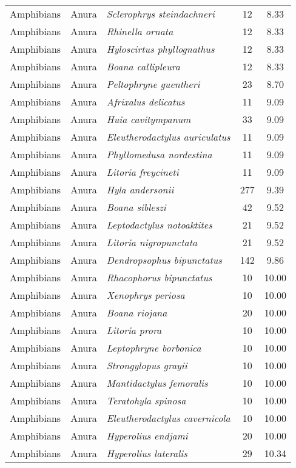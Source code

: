 \begin{longtable}{ll>{\itshape}lcc}
  Amphibians & Anura & Sclerophrys steindachneri &  12 & 8.33 \\ 
  Amphibians & Anura & Rhinella ornata &  12 & 8.33 \\ 
  Amphibians & Anura & Hyloscirtus phyllognathus &  12 & 8.33 \\ 
  Amphibians & Anura & Boana callipleura &  12 & 8.33 \\ 
  Amphibians & Anura & Peltophryne guentheri &  23 & 8.70 \\ 
  Amphibians & Anura & Afrixalus delicatus &  11 & 9.09 \\ 
  Amphibians & Anura & Huia cavitympanum &  33 & 9.09 \\ 
  Amphibians & Anura & Eleutherodactylus auriculatus &  11 & 9.09 \\ 
  Amphibians & Anura & Phyllomedusa nordestina &  11 & 9.09 \\ 
  Amphibians & Anura & Litoria freycineti &  11 & 9.09 \\ 
  Amphibians & Anura & Hyla andersonii & 277 & 9.39 \\ 
  Amphibians & Anura & Boana sibleszi &  42 & 9.52 \\ 
  Amphibians & Anura & Leptodactylus notoaktites &  21 & 9.52 \\ 
  Amphibians & Anura & Litoria nigropunctata &  21 & 9.52 \\ 
  Amphibians & Anura & Dendropsophus bipunctatus & 142 & 9.86 \\ 
  Amphibians & Anura & Rhacophorus bipunctatus &  10 & 10.00 \\ 
  Amphibians & Anura & Xenophrys periosa &  10 & 10.00 \\ 
  Amphibians & Anura & Boana riojana &  20 & 10.00 \\ 
  Amphibians & Anura & Litoria prora &  10 & 10.00 \\ 
  Amphibians & Anura & Leptophryne borbonica &  10 & 10.00 \\ 
  Amphibians & Anura & Strongylopus grayii &  10 & 10.00 \\ 
  Amphibians & Anura & Mantidactylus femoralis &  10 & 10.00 \\ 
  Amphibians & Anura & Teratohyla spinosa &  10 & 10.00 \\ 
  Amphibians & Anura & Eleutherodactylus cavernicola &  10 & 10.00 \\ 
  Amphibians & Anura & Hyperolius endjami &  20 & 10.00 \\ 
  Amphibians & Anura & Hyperolius lateralis &  29 & 10.34 \\ 

\end{longtable}
